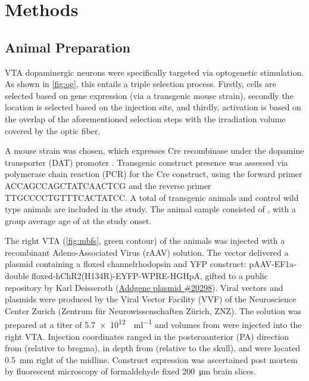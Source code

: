 \section{Methods}

\subsection{Animal Preparation}

VTA dopaminergic neurons were specifically targeted via optogenetic stimulation.
As shown in \cref{fig:og}, this entails a triple selection process.
Firstly, cells are selected based on gene expression (via a transgenic mouse strain), secondly the location is selected based on the injection site, and thirdly, activation is based on the overlap of the aforementioned selection steps with the irradiation volume covered by the optic fiber.

A mouse strain was chosen, which expresses Cre recombinase under the dopamine transporter (DAT) promoter \cite{dat}.
Transgenic construct presence was assessed via polymerase chain reaction (PCR) for the Cre construct, using the forward primer ACCAGCCAGCTATCAACTCG and the reverse primer TTGCCCCTGTTTCACTATCC.
A total of  transgenic animals and  control wild type animals are included in the study.
The animal sample consisted of , with a group average age of  at the study onset.

The right VTA (\cref{fig:mbfs}, green contour) of the animals was injected with a recombinant Adeno-Associated Virus (rAAV) solution.
The vector delivered a plasmid containing a floxed channelrhodopsin and YFP construct:
pAAV-EF1a-double floxed-hChR2(H134R)-EYFP-WPRE-HGHpA, gifted to a public repository by Karl Deisseroth (\href{https://www.addgene.org/20298/}{Addgene plasmid \#20298}).
Viral vectors and plasmids were produced by the Viral Vector Facility (VVF) of the Neuroscience Center Zurich (Zentrum für Neurowissenschaften Zürich, ZNZ).
The solution was prepared at a titer of \SI{5.7e12}{\vg\per\milli\litre} and volumes from
were injected into the right VTA.
Injection coordinates ranged in the posteroanterior (PA) direction from
 (relative to bregma),
in depth from
 (relative to the skull),
and were located \SI{0.5}{\milli\meter} right of the midline.
Construct expression was ascertained post mortem by fluorescent microscopy of formaldehyde fixed \SI{200}{\micro\metre} brain slices.

